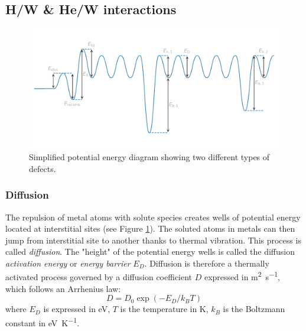 \subsection{H/W \& He/W interactions}


\begin{figure} [h]
    \centering
    \includegraphics[width=\linewidth]{Figures/Chapter1/potential_energy_diagram.pdf}
    \caption{Simplified potential energy diagram showing two different types of defects.}
    \label{fig: potential energy diagram metal lattice}
\end{figure}

\subsubsection{Diffusion}
The repulsion of metal atoms with solute species creates wells of potential energy located at interstitial sites (see Figure \ref{fig: potential energy diagram metal lattice}).
The soluted atoms in metals can then jump from interstitial site to another thanks to thermal vibration.
This process is called \textit{diffusion}.
The "height" of the potential energy wells is called the diffusion \textit{activation energy} or \textit{energy barrier} $E_D$.
Diffusion is therefore a thermally activated process governed by a diffusion coefficient $D$ expressed in \si{m^2.s^{-1}}, which follows an Arrhenius law:
\begin{equation}
    D = D_0 \exp{(-E_D/k_B T)}
\end{equation}
where $E_D$ is expressed in \si{eV}, $T$ is the temperature in \si{K}, $k_B$ is the Boltzmann constant in \si{eV.K^{-1}}.

